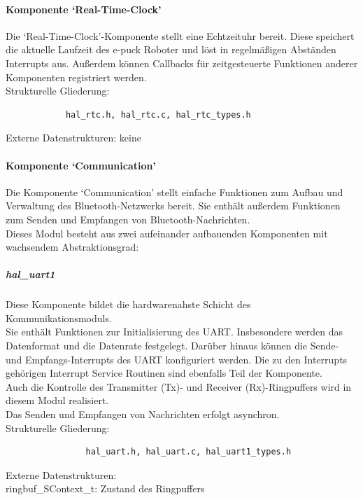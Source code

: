\documentclass[10pt,a4paper]{article}
\begin{document}
			\paragraph*{Komponente `Real-Time-Clock'}
			Die `Real-Time-Clock'-Komponente stellt eine Echtzeituhr bereit. Diese speichert die aktuelle Laufzeit des e-puck Roboter und löst in
			regelmäßigen Abständen Interrupts aus.
			Außerdem können Callbacks für zeitgesteuerte Funktionen anderer Komponenten registriert werden. \\
			
			Strukturelle Gliederung:
			\begin{verbatim}  
			hal_rtc.h, hal_rtc.c, hal_rtc_types.h
			\end{verbatim}
			
			Externe Datenstrukturen: keine
			
			\paragraph*{Komponente `Communication'}
			Die Komponente `Communication' stellt einfache Funktionen zum Aufbau und Verwaltung  des Bluetooth-Netzwerks bereit.
			Sie enthält außerdem Funktionen zum Senden und Empfangen von Bluetooth-Nachrichten.\\
			 
			Dieses Modul besteht aus zwei aufeinander aufbauenden Komponenten mit wachsendem Abstraktionsgrad:
			
				\subparagraph*{hal\_uart1}
				Diese Komponente bildet die hardwarenahste Schicht des Kommunikationsmoduls. \\
				Sie enthält Funktionen zur Initialisierung des UART. Insbesondere werden das Datenformat und die Datenrate festgelegt.
				Darüber hinaus können die Sende- und Empfangs-Interrupts des UART konfiguriert werden. Die zu den Interrupts gehörigen Interrupt
				Service Routinen sind ebenfalls Teil der Komponente. \\
				Auch die Kontrolle des Transmitter (Tx)- und Receiver (Rx)-Ringpuffers wird in diesem Modul realisiert. \\
				Das Senden und Empfangen von Nachrichten erfolgt asynchron. \\
				
				Strukturelle Gliederung:
				\begin{verbatim}  
				hal_uart.h, hal_uart.c, hal_uart1_types.h
				\end{verbatim}
				
				Externe Datenstrukturen: \\
				ringbuf\_SContext\_t: Zustand des Ringpuffers
				
\end{document}
